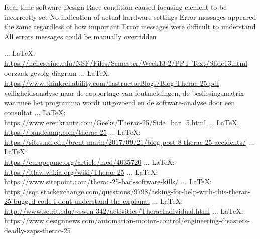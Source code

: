 \begin{thebibliography}{99}
Real-time software
Design
Race condition caused focusing element to be incorrectly set
No indication of actual hardware settings
Error messages appeared the same regardless of how important
Error messages were difficult to understand
All errors messages could be manually overridden

 ... \LaTeX:\\ \url{https://hci.cs.siue.edu/NSF/Files/Semester/Week13-2/PPT-Text/Slide13.html}
oorzaak-gevolg diagram
 ... \LaTeX:\\ \url{https://www.thinkreliability.com/InstructorBlogs/Blog-Therac-25.pdf}
veiligheidsanalyse naar de rapportage van foutmeldingen, de beslissingsmatrix waarmee het programma wordt uitgevoerd en de software-analyse door een consultat
 ... \LaTeX:\\ \url{https://www.erenkrantz.com/Geeks/Therac-25/Side_bar_5.html}
 ... \LaTeX:\\ \url{https://bandcamp.com/therac-25}
 ... \LaTeX:\\ \url{https://sites.nd.edu/brent-marin/2017/09/21/blog-post-8-therac-25-accidents/}
 ... \LaTeX:\\ \url{https://europepmc.org/article/med/4035720}
 ... \LaTeX:\\ \url{https://itlaw.wikia.org/wiki/Therac-25}
 ... \LaTeX:\\ \url{https://www.sitepoint.com/therac-25-bad-software-kills/}
 ... \LaTeX:\\ \url{https://sqa.stackexchange.com/questions/9798/asking-for-help-with-this-therac-25-bugged-code-i-dont-understand-the-explanat}
 ... \LaTeX:\\ \url{http://www.se.rit.edu/~swen-342/activities/TheracIndividual.html}
 ... \LaTeX:\\ \url{https://www.designnews.com/automation-motion-control/engineering-disasters-deadly-zaps-therac-25}


\end{thebibliography}
